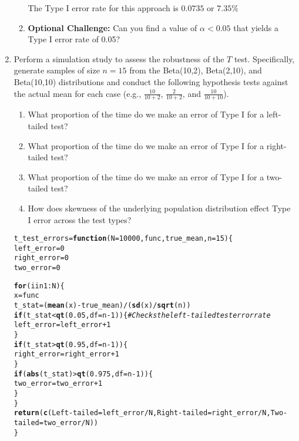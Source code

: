 \documentclass{article}\usepackage[]{graphicx}\usepackage[]{xcolor}
\makeatletter
\newcommand{\hlcom}[1]{\textcolor[rgb]{0.678,0.584,0.686}{\textit{#1}}}%
\newcommand{\hlkwd}[1]{\textcolor[rgb]{0.737,0.353,0.396}{\textbf{#1}}}%
\newenvironment{kframe}{%
 \def\at@end@of@kframe{}%
 \ifinner\ifhmode%
  \def\at@end@of@kframe{\end{minipage}}%
  \begin{minipage}{\columnwidth}%
 \fi\fi%
 \def\FrameCommand##1{\hskip\@totalleftmargin \hskip-\fboxsep
 \colorbox{shadecolor}{##1}\hskip-\fboxsep
     \hskip-\linewidth \hskip-\@totalleftmargin \hskip\columnwidth}%
 \MakeFramed {\advance\hsize-\width
   \@totalleftmargin\z@ \linewidth\hsize
   \@setminipage}}%
 {\par\unskip\endMakeFramed%
 \at@end@of@kframe}
\newenvironment{knitrout}{}{} %
\makeatother
\begin{document}
\begin{enumerate}
\begin{enumerate}
  The Type I error rate for this approach is $0.0735$ or $7.35\%$
  
  \item \textbf{Optional Challenge:} Can you find a value of $\alpha<0.05$ that yields a 
  Type I error rate of 0.05?
\end{enumerate}
  \item Perform a simulation study to assess the robustness of the $T$ test. 
  Specifically, generate samples of size $n=15$ from the Beta(10,2), Beta(2,10), 
  and Beta(10,10) distributions and conduct the following hypothesis tests against 
  the actual mean for each case (e.g., $\frac{10}{10+2}$, $\frac{2}{10+2}$, and 
  $\frac{10}{10+10}$). 
  \begin{enumerate}
    \item What proportion of the time do we make an error of Type I for a
    left-tailed test?
    \item What proportion of the time do we make an error of Type I for a
    right-tailed test?
    \item What proportion of the time do we make an error of Type I for a
    two-tailed test?
    \item How does skewness of the underlying population distribution effect
    Type I error across the test types?
  \end{enumerate}
  
\begin{knitrout}
\color{fgcolor}\begin{kframe}
\begin{alltt}
t_test_errors = \hlkwd{function}(N = 10000, func, true_mean, n = 15)\{
  left_error = 0
  right_error = 0
  two_error = 0
  
  \hlkwd{for} (i in 1:N)\{
    x = func
    t_stat = (\hlkwd{mean}(x) - true_mean) / (\hlkwd{sd}(x) / \hlkwd{sqrt}(n))
    \hlkwd{if} (t_stat < \hlkwd{qt}(0.05, df = n - 1))\{ \hlcom{# Checks the left-tailed test error rate}
      left_error = left_error + 1
    \}
    \hlkwd{if} (t_stat > \hlkwd{qt}(0.95, df = n - 1))\{
      right_error = right_error + 1
    \}
    \hlkwd{if}(\hlkwd{abs}(t_stat) > \hlkwd{qt}(0.975, df = n - 1))\{
      two_error = two_error + 1
    \}
  \}
  \hlkwd{return}(\hlkwd{c}(Left-tailed = left_error/N, Right-tailed = right_error/N, Two-tailed = two_error/N))
\}


\end{alltt}
\end{kframe}
\end{knitrout}
\end{enumerate}
\end{document}
